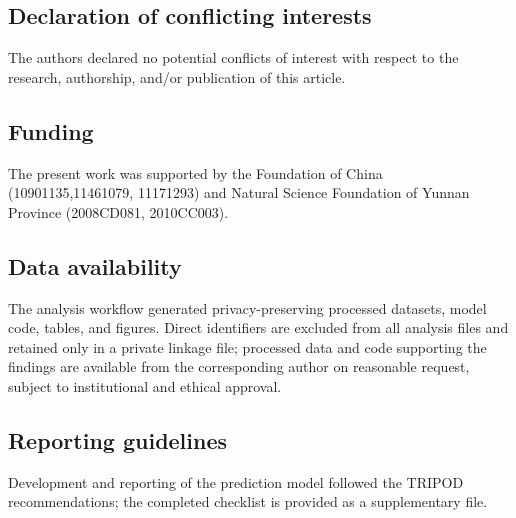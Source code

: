 \documentclass[11pt]{article}
\begin{document}
\subsection*{Declaration of conflicting interests}
The authors declared no potential conflicts of interest with respect to the
research, authorship, and/or publication of this article.

\subsection*{Funding}
The present work was supported by the Foundation of China (10901135,11461079, 11171293) and Natural Science Foundation
of Yunnan Province (2008CD081, 2010CC003). 

\subsection*{Data availability}
The analysis workflow generated privacy-preserving processed datasets,
model code, tables, and figures. Direct identifiers are excluded from all
analysis files and retained only in a private linkage file; processed data
and code supporting the findings are available from the corresponding
author on reasonable request, subject to institutional and ethical
approval.

\subsection*{Reporting guidelines}
Development and reporting of the prediction model followed the TRIPOD
recommendations; the completed checklist is provided as a supplementary
file.



\end{document}
